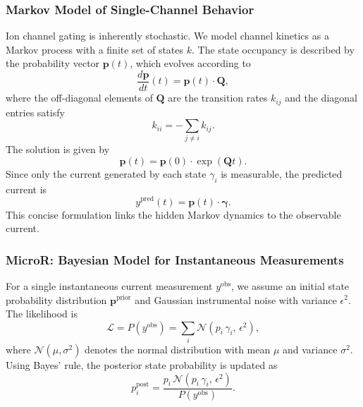\documentclass[pdflatex,sn-mathphys-num]{sn-jnl}%
\theoremstyle{thmstyleone}%
\theoremstyle{thmstyletwo}%
\theoremstyle{thmstylethree}%
\begin{document}
\subsubsection{Markov Model of Single-Channel Behavior}

Ion channel gating is inherently stochastic. We model channel kinetics as a Markov process with a finite set of states \(k\). The state occupancy is described by the probability vector \(\boldsymbol{p}(t)\), which evolves according to
\begin{equation}
	\frac{d\boldsymbol{p}}{dt}(t) = \boldsymbol{p}(t)\cdot \boldsymbol{Q},
	\label{eq:master_equation_short}
\end{equation}
where the off-diagonal elements of \(\boldsymbol{Q}\) are the transition rates \(k_{ij}\) and the diagonal entries satisfy
\begin{equation}
	k_{ii} = -\sum_{j\neq i} k_{ij}.
	\label{eq:Q_diag_short}
\end{equation}
The solution is given by
\begin{equation}
	\boldsymbol{p}(t) = \boldsymbol{p}(0) \cdot \exp(\boldsymbol{Q}t).
	\label{eq:solution_short}
\end{equation}
Since only the current generated by each state \(\gamma_i\) is measurable, the predicted current is
\begin{equation}
	y^{\text{pred}}(t) = \boldsymbol{p}(t)\cdot \boldsymbol{\gamma}.
	\label{eq:current_pred_short}
\end{equation}
This concise formulation links the hidden Markov dynamics to the observable current.

\subsubsection{MicroR: Bayesian Model for Instantaneous Measurements}

For a single instantaneous current measurement \(y^{\text{obs}}\), we assume an initial state probability distribution \(\boldsymbol{p}^{\text{prior}}\) and Gaussian instrumental noise with variance \(\epsilon^2\). The likelihood is
\begin{equation}
	\mathcal{L} = P(y^{\text{obs}}) = \sum_i \mathcal{N}(p_i\,\gamma_i,\,\epsilon^2),
	\label{eq:single_channel_likelihood_short}
\end{equation}
where \(\mathcal{N}(\mu,\sigma^2)\) denotes the normal distribution with mean \(\mu\) and variance \(\sigma^2\). Using Bayes' rule, the posterior state probability is updated as
\begin{equation}
	p^{\text{post}}_i = \frac{p_i\,\mathcal{N}(p_i\,\gamma_i,\,\epsilon^2)}{P(y^{\text{obs}})}.
	\label{eq:single_channel_posterior_short}
\end{equation}
\end{document}
